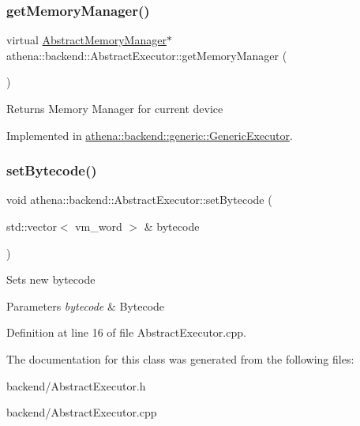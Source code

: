 \subsubsection{\texorpdfstring{get\+Memory\+Manager()}{getMemoryManager()}}
{\footnotesize\ttfamily virtual \mbox{\hyperlink{classathena_1_1backend_1_1_abstract_memory_manager}{Abstract\+Memory\+Manager}}$\ast$ athena\+::backend\+::\+Abstract\+Executor\+::get\+Memory\+Manager (\begin{DoxyParamCaption}{ }\end{DoxyParamCaption})\hspace{0.3cm}{\ttfamily [pure virtual]}}

\begin{DoxyReturn}{Returns}
Memory Manager for current device 
\end{DoxyReturn}


Implemented in \mbox{\hyperlink{classathena_1_1backend_1_1generic_1_1_generic_executor_a0560a1dfc0c70ebef0b5be26bb82b9c5}{athena\+::backend\+::generic\+::\+Generic\+Executor}}.

\mbox{\label{classathena_1_1backend_1_1_abstract_executor_afa06d9875ee6c53986873f29db380893}} 
\subsubsection{\texorpdfstring{set\+Bytecode()}{setBytecode()}}
{\footnotesize\ttfamily void athena\+::backend\+::\+Abstract\+Executor\+::set\+Bytecode (\begin{DoxyParamCaption}\item[{std\+::vector$<$ vm\+\_\+word $>$ \&}]{bytecode }\end{DoxyParamCaption})}

Sets new bytecode 
\begin{DoxyParams}{Parameters}
{\em bytecode} & Bytecode \\
\hline
\end{DoxyParams}


Definition at line 16 of file Abstract\+Executor.\+cpp.



The documentation for this class was generated from the following files\+:\begin{DoxyCompactItemize}
\item 
backend/Abstract\+Executor.\+h\item 
backend/Abstract\+Executor.\+cpp\end{DoxyCompactItemize}
